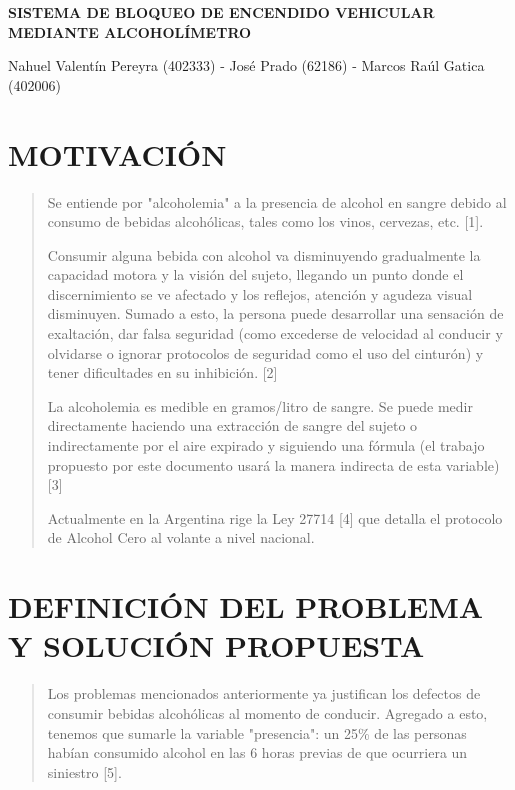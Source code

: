 \documentclass[a4paper,11pt]{article}
\title{}
\author{}
\date{}
\begin{document}
	\begin{center}
		\textbf{\fontsize{15pt}{17pt}\selectfont  SISTEMA DE BLOQUEO DE ENCENDIDO VEHICULAR MEDIANTE ALCOHOLÍMETRO}
		
		
		Nahuel Valentín Pereyra (402333) - José Prado (62186) - Marcos Raúl Gatica (402006)
		
	\end{center}
	
	\begin{multicols}{2}
		
		\section{MOTIVACIÓN}
			\begin{quotation}
				Se entiende por "alcoholemia" a la presencia de alcohol en sangre debido al consumo de bebidas alcohólicas, tales como los vinos, cervezas, etc. [1]. 
				
				Consumir alguna bebida con alcohol va disminuyendo gradualmente la capacidad motora y la visión del sujeto, llegando un punto donde el discernimiento se ve afectado y los reflejos, atención y agudeza visual disminuyen. Sumado a esto, la persona puede desarrollar una sensación de exaltación, dar falsa seguridad (como excederse de velocidad al conducir y olvidarse o ignorar protocolos de seguridad como el uso del cinturón) y tener dificultades en su inhibición. [2]
				
				La alcoholemia es medible en gramos/litro de sangre. Se puede medir directamente haciendo una extracción de sangre del sujeto o indirectamente por el aire expirado y siguiendo una fórmula (el trabajo propuesto por este documento usará la manera indirecta de esta variable) [3]
				
				Actualmente en la Argentina rige la Ley 27714 [4] que detalla el protocolo de Alcohol Cero al volante a nivel nacional.
				
			\end{quotation}	
		
			\section{\textbf{DEFINICIÓN DEL PROBLEMA \newline Y SOLUCIÓN PROPUESTA}}
				\begin{quotation}
					Los problemas mencionados anteriormente ya justifican los defectos de consumir bebidas alcohólicas al momento de conducir. Agregado a esto, tenemos que sumarle la variable "presencia": un 25\% de las personas habían consumido alcohol en las 6 horas previas de que ocurriera un siniestro [5].  
				

\end{quotation}
\end{multicols}
\end{document}
